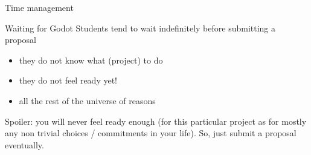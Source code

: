 \documentclass[presentation]{beamer}\mode<presentation>{\usetheme{AMSBolognaFC}}
\begin{document}
\begin{frame}[c,allowframebreaks]{Time management}
    
    
    \begin{block}{Waiting for Godot}
        Students tend to wait indefinitely before submitting a proposal
        \begin{itemize}
            \item they do not know what (project) to do
            \item \alert{they do not feel ready yet!}
            \item all the rest of the universe of reasons
        \end{itemize}
    \end{block}
    Spoiler: you will never feel ready enough (for this particular project as for mostly any non trivial choices / commitments in your life).
    So, just submit a proposal eventually.
\end{frame}
    
\end{document}
